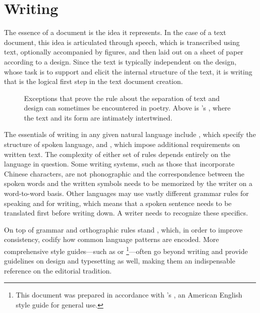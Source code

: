 \chapter{Writing}
The essence of a document is the idea it represents. In the case of a text
document, this idea is articulated through speech, which is transcribed using
text, optionally accompanied by figures, and then laid out on a sheet of paper
according to a design. Since the text is typically independent on the design,
whose task is to support and elicit the internal structure of the text, it is
writing that is the logical first step in the text document creation.

\begin{figure}
  
  \caption{Exceptions that prove the rule about the separation of text and
    design can sometimes be encountered in poetry. Above is 's , where the text and its
    form are intimately intertwined.}
\end{figure}

The essentials of writing in any given natural language include , which specify the structure of spoken
language, and , which
impose additional requirements on written text. The complexity of either set of
rules depends entirely on the language in question. Some writing systems, such
as those that incorporate Chinese characters, are not phonographic and the
correspondence between the spoken words and the written symbols needs to be
memorized by the writer on a word-to-word basis. Other languages may use vastly
different grammar rules for speaking and for writing, which means that a spoken
sentence needs to be translated first before writing down. A writer needs to
recognize these specifics.

On top of grammar and orthographic rules stand , which, in
order to improve consistency, codify how common language patterns are encoded.
More comprehensive style guides---such as  or
\footnote{
  This document was prepared in accordance with 's
  , an American English style guide for general use. 
}---often go beyond writing and provide guidelines on design and typesetting as
well, making them an indispensable reference on the editorial tradition.

